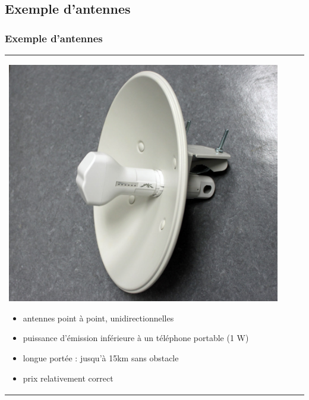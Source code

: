 \documentclass[handout]{beamer}
\begin{document}
	\subsection{Exemple d'antennes}
		\begin{frame}
		\frametitle{Exemple d'antennes}
		\begin{tabular}{l l}
			\begin{minipage}{0.4\textwidth}
				\begin{center}
					\includegraphics[width=0.95\textwidth]{images/nanobridge.jpg}
				\end{center}
			\end{minipage}

			\begin{minipage}{0.6\textwidth}
				\begin{itemize}
					\item antennes point à point, unidirectionnelles
					\item puissance d'émission inférieure à un téléphone portable (1 W)
					\item longue portée : jusqu'à 15km sans obstacle
					\item prix relativement correct
				\end{itemize}
			\end{minipage}
			
		\end{tabular}
		\end{frame}
\end{document}
